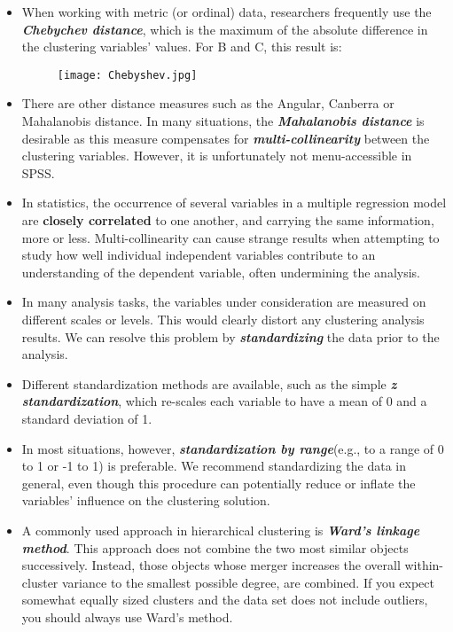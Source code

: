 \documentclass[a4paper,12pt]{article}
\begin{document}
\begin{itemize}
\item When working with metric (or ordinal) data, researchers frequently use
the \textbf{\textit{Chebychev distance}}, which is the maximum of the absolute difference in the
clustering variables’ values. For B and C, this result is:

\begin{figure}[h!]
\begin{center}
  \texttt{[image: Chebyshev.jpg]}\\
\end{center}
\end{figure}

\item There are other distance measures such as the Angular, Canberra or Mahalanobis
distance. In many situations, the \textbf{\textit{Mahalanobis
distance}} is desirable as this measure compensates for \textbf{\textit{multi-collinearity}}
between the clustering variables. However, it is unfortunately not menu-accessible
in SPSS.
\item
In statistics, the occurrence of several  variables in a multiple regression model are \textbf{closely correlated} to one another, and carrying the same information, more or less. Multi-collinearity can cause strange results when attempting to study how well individual independent variables contribute to an understanding of the dependent variable, often undermining the analysis.

\item In many analysis tasks, the variables under consideration are measured on
different scales or levels. This would
clearly distort any clustering analysis results. We can resolve this problem by \textbf{\textit{standardizing}}
the data prior to the analysis.

\item Different standardization methods are available, such as the simple \textbf{\textit{z standardization}},
which re-scales each variable to have a mean of 0 and a standard deviation of 1.

\item In most situations, however, \textbf{\textit{standardization by range}}(e.g., to a
range of 0 to 1 or -1 to 1) is preferable. We recommend standardizing the data
in general, even though this procedure can potentially reduce or inflate the variables’ influence
on the clustering solution.

\item A commonly used approach in hierarchical clustering is \textbf{\textit{Ward’s linkage method}}.
This approach does not combine the two most similar objects successively. Instead,
those objects whose merger increases the overall within-cluster variance to the
smallest possible degree, are combined. If you expect somewhat equally sized
clusters and the data set does not include outliers, you should always use Ward’s
method.


\end{itemize}
\end{document}
